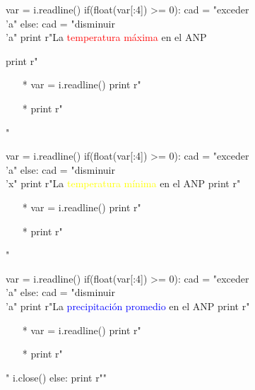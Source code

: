 \documentclass{article}
\begin{document}
\begin{python}
{		      var = i.readline()
		      if(float(var[:4]) >= 0):
		         cad = "exceder\\'a"
		      else:
		         cad = "disminuir\\'a"
		      print r"La \textcolor{red}{temperatura m\'axima} en el ANP %
		      
		      print r"\begin{itemize}"
		      print r"\setlength\itemsep{1em}"
		      print r"\item[*] %
		      var = i.readline()
		      print r"\item[*] %
		      print r"\end{itemize}"

		      var = i.readline()
		      if(float(var[:4]) >= 0):
		         cad = "exceder\\'a"
		      else:
		         cad = "disminuir\\'x"
		      print r"La \textcolor{yellow}{temperatura m\'inima} en el ANP %
		      print r"\begin{itemize}"
		      print r"\setlength\itemsep{0em}"
		      print r"\item[*] %
		      var = i.readline()
		      print r"\item[*] %
		      print r"\end{itemize}"

		      var = i.readline()
		      if(float(var[:4]) >= 0):
		         cad = "exceder\\'a"
		      else:
		         cad = "disminuir\\'a"
		      print r"La \textcolor{blue}{precipitaci\'on promedio} en el ANP %
		      print r"\begin{itemize}"
		      print r"\item[*] %
		      var = i.readline()
		      print r"\item[*] %
		      print r"\end{itemize}"
		      i.close()
		   else:
		      print r""

}
\end{python}
\end{document}
